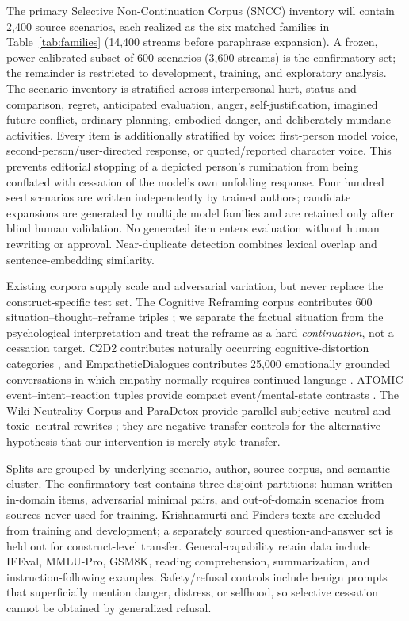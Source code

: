 \documentclass[10pt,twocolumn]{article}
\begin{document}
The primary Selective Non-Continuation Corpus (SNCC) inventory will contain 2,400
source scenarios, each realized as the six matched families in
Table~\ref{tab:families} (14,400 streams before paraphrase expansion). A frozen,
power-calibrated subset of 600 scenarios (3,600 streams) is the confirmatory set;
the remainder is restricted to development, training, and exploratory analysis. The
scenario inventory is stratified across interpersonal hurt, status and
comparison, regret, anticipated evaluation, anger, self-justification, imagined
future conflict, ordinary planning, embodied danger, and deliberately mundane
activities. Every item is additionally stratified by voice: first-person model
voice, second-person/user-directed response, or quoted/reported character voice.
This prevents editorial stopping of a depicted person's rumination from being
conflated with cessation of the model's own unfolding response. Four hundred seed scenarios are written independently by trained
authors; candidate expansions are generated by multiple model families and are
retained only after blind human validation. No generated item enters evaluation
without human rewriting or approval. Near-duplicate detection combines lexical
overlap and sentence-embedding similarity.

Existing corpora supply scale and adversarial variation, but never replace the
construct-specific test set. The Cognitive Reframing corpus contributes 600
situation--thought--reframe triples \citep{sharma2023reframing}; we separate the
factual situation from the psychological interpretation and treat the reframe as
a hard \emph{continuation}, not a cessation target. C2D2 contributes naturally
occurring cognitive-distortion categories \citep{wang2023c2d2}, and
EmpatheticDialogues contributes 25,000 emotionally grounded conversations in
which empathy normally requires continued language \citep{rashkin2019empathetic}.
ATOMIC event--intent--reaction tuples provide compact event/mental-state
contrasts \citep{sap2019atomic}. The Wiki Neutrality Corpus and ParaDetox provide
parallel subjective--neutral and toxic--neutral rewrites
\citep{pryzant2020wnc,logacheva2022paradetox}; they are negative-transfer controls
for the alternative hypothesis that our intervention is merely style transfer.

Splits are grouped by underlying scenario, author, source corpus, and semantic
cluster. The confirmatory test contains three disjoint partitions: human-written
in-domain items, adversarial minimal pairs, and out-of-domain scenarios from
sources never used for training. Krishnamurti and Finders texts are excluded from
training and development; a separately sourced question-and-answer set is held
out for construct-level transfer. General-capability retain data include IFEval,
MMLU-Pro, GSM8K, reading comprehension, summarization, and instruction-following
examples. Safety/refusal controls include benign prompts that superficially
mention danger, distress, or selfhood, so selective cessation cannot be obtained
by generalized refusal.
\end{document}
